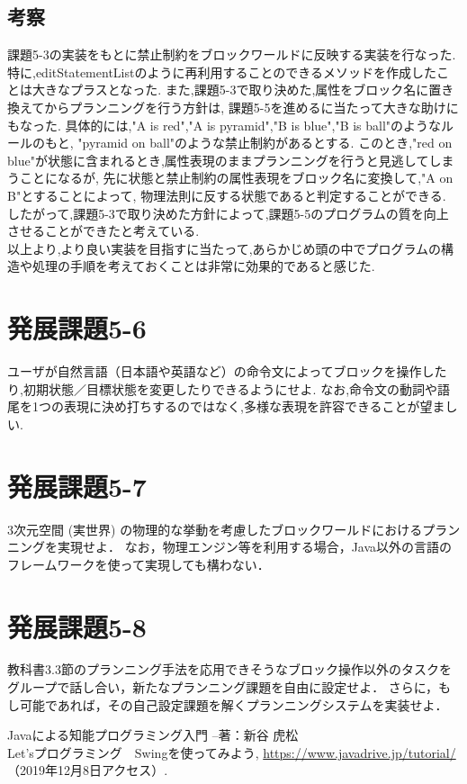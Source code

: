 \documentclass[uplatex,12pt]{jsarticle}
\begin{document}
\subsection{考察}
課題5-3の実装をもとに禁止制約をブロックワールドに反映する実装を行なった.
特に,editStatementListのように再利用することのできるメソッドを作成したことは大きなプラスとなった.
また,課題5-3で取り決めた,属性をブロック名に置き換えてからプランニングを行う方針は,
課題5-5を進めるに当たって大きな助けにもなった.
具体的には,"A is red","A is pyramid","B is blue","B is ball"のようなルールのもと,
"pyramid on ball"のような禁止制約があるとする.
このとき,"red on blue"が状態に含まれるとき,属性表現のままプランニングを行うと見逃してしまうことになるが,
先に状態と禁止制約の属性表現をブロック名に変換して,"A on B"とすることによって,
物理法則に反する状態であると判定することができる. \\
したがって,課題5-3で取り決めた方針によって,課題5-5のプログラムの質を向上させることができたと考えている. \\
以上より,より良い実装を目指すに当たって,あらかじめ頭の中でプログラムの構造や処理の手順を考えておくことは非常に効果的であると感じた.


\section{発展課題5-6}
\begin{screen}
    ユーザが自然言語（日本語や英語など）の命令文によってブロックを操作したり,初期状態／目標状態を変更したりできるようにせよ.
    なお,命令文の動詞や語尾を1つの表現に決め打ちするのではなく,多様な表現を許容できることが望ましい.
\end{screen}

\section{発展課題5-7}
\begin{screen}
    3次元空間 (実世界) の物理的な挙動を考慮したブロックワールドにおけるプランニングを実現せよ．
    なお，物理エンジン等を利用する場合，Java以外の言語のフレームワークを使って実現しても構わない．
\end{screen}


\section{発展課題5-8}
\begin{screen}
    教科書3.3節のプランニング手法を応用できそうなブロック操作以外のタスクをグループで話し合い，新たなプランニング課題を自由に設定せよ．
    さらに，もし可能であれば，その自己設定課題を解くプランニングシステムを実装せよ．
\end{screen}


\begin{thebibliography}{99}
 Javaによる知能プログラミング入門 --著：新谷 虎松 \\
 Let'sプログラミング　Swingを使ってみよう, \url{https://www.javadrive.jp/tutorial/} （2019年12月8日アクセス）.
\end{thebibliography}
\end{document}
